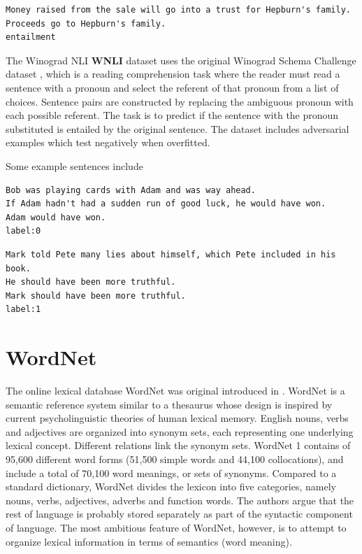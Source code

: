 \documentclass[a4paper,12pt,twoside,openright]{report}
\begin{document}
\begin{verbatim}
Money raised from the sale will go into a trust for Hepburn's family.
Proceeds go to Hepburn's family.	
entailment
\end{verbatim}


The Winograd NLI \textbf{WNLI} dataset uses the original Winograd Schema Challenge dataset \cite{levesque2012}, which is a reading comprehension task where the reader must read a sentence with a pronoun and select the referent of that pronoun from a list of choices. 
Sentence pairs are constructed by replacing the ambiguous pronoun with each possible referent.
The task is to predict if the sentence with the pronoun substituted is entailed by the original sentence.
The dataset includes adversarial examples which test negatively when overfitted.

Some example sentences include 

\begin{verbatim}
Bob was playing cards with Adam and was way ahead.
If Adam hadn't had a sudden run of good luck, he would have won.	Adam would have won.
label:0
\end{verbatim}

\begin{verbatim}
Mark told Pete many lies about himself, which Pete included in his book. 
He should have been more truthful.	
Mark should have been more truthful.
label:1
\end{verbatim}


\section{WordNet}

The online lexical database WordNet was original introduced in \cite{miller90}.
WordNet is a semantic reference system similar to a thesaurus whose design is inspired by current psycholinguistic theories of human lexical memory.
English nouns, verbs and adjectives are organized into synonym sets, each representing one underlying lexical concept.
Different relations link the synonym sets.
WordNet 1 contains of 95,600 different word forms (51,500 simple words and 44,100 collocations), and include a total of 70,100 word meanings, or sets of synonyms.
Compared to a standard dictionary, WordNet divides the lexicon into five categories, namely nouns, verbs, adjectives, adverbs and function words. 
The authors argue that the rest of language is probably stored separately as part of the syntactic component of language.
The most ambitious feature of WordNet, however, is to attempt to organize lexical information in terms of semantics (word meaning).
\end{document}
